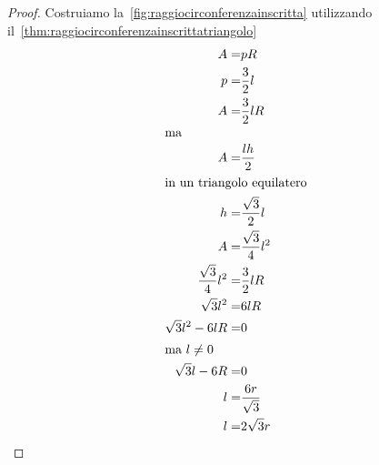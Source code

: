 \begin{proof}
Costruiamo la~\cref{fig:raggiocirconferenzainscritta}	
utilizzando il~\cref{thm:raggiocirconferenzainscrittatriangolo}
\begin{align*}
	A=&pR\\
	p=&\frac{3}{2}l\\
	A=&\frac{3}{2}lR\\
	\intertext{ma}
	A=&\frac{lh}{2}\\
	\intertext{in un triangolo equilatero}
	h=&\frac{\sqrt{3}}{2}l\\
	A=&\frac{\sqrt{3}}{4}l^2\\
	\frac{\sqrt{3}}{4}l^2=&\frac{3}{2}lR\\
	\sqrt{3}l^2=&6lR\\
	\sqrt{3}l^2-6lR=&0\\
	\intertext{ma $l\neq0$}
	\sqrt{3}l-6R=&0\\
	l=&\dfrac{6r}{\sqrt{3}}\\
	l=&2\sqrt{3}r\\
\end{align*}
\end{proof}